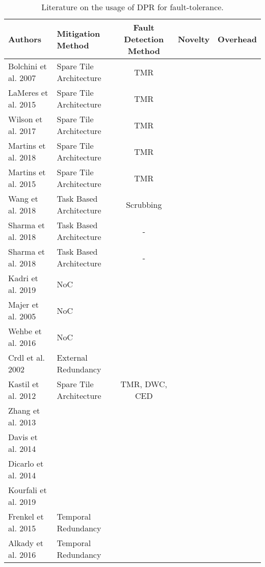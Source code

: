 \begin{table*}
    \caption{Literature on the usage of \gls{DPR} for fault-tolerance.}
    \begin{tabular*}{\textwidth}{@{\extracolsep{\fill}}llccc}
        \toprule
       \textbf{Authors} & \textbf{Mitigation Method} & \textbf{Fault Detection Method} & \textbf{Novelty} & \textbf{Overhead} \\
       \midrule
       \cite{bolchini2007} Bolchini et al. 2007        & Spare Tile Architecture      & TMR & \\
       \cite{lameres_radsat_2015} LaMeres et al. 2015       & Spare Tile Architecture      & TMR & \\
       \cite{wilson_hybrid_2017} Wilson et al. 2017         & Spare Tile Architecture      & TMR & \\
       \cite{martins_dynamic_2018} Martins et al. 2018      & Spare Tile Architecture      & TMR & \\
       \cite{martins_tmr_2015} Martins et al. 2015          & Spare Tile Architecture      & TMR & \\
       \cite{wang_dynamic_2018} Wang et al. 2018            & Task Based Architecture      & Scrubbing & \\
       \cite{sharma_run-time_2018} Sharma et al. 2018       & Task Based Architecture      & - & \\
       \cite{sharma_run-time_2018} Sharma et al. 2018       & Task Based Architecture      & - & \\
       \cite{kadri_survey_2019} Kadri et al. 2019           & NoC                          & &\\
       \cite{majer_packet_2005} Majer et al. 2005           & NoC                          & &\\
       \cite{wehbe_secure_2016} Wehbe et al. 2016           & NoC                          & &\\
       \cite{crdl_fail-safe_2002} Crdl et al. 2002          & External Redundancy           & &\\
       \cite{kastil2012} Kastil et al. 2012                 & Spare Tile Architecture      & TMR, DWC, CED  &\\
       \cite{zhang2013} Zhang et al. 2013                   &            & &\\
       \cite{davis2014} Davis et al. 2014                   &            & &\\
       \cite{dicarlo2014} Dicarlo et al. 2014               &            & &\\
       \cite{kourfali2019} Kourfali et al. 2019             &            & &\\
       \cite{frenkel2015} Frenkel et al. 2015             & Temporal Redundancy       &  &\\
       \cite{alkady_integration_2016} Alkady et al. 2016             & Temporal Redundancy             & &\\
       \bottomrule
    \end{tabular*}
\end{table*}
